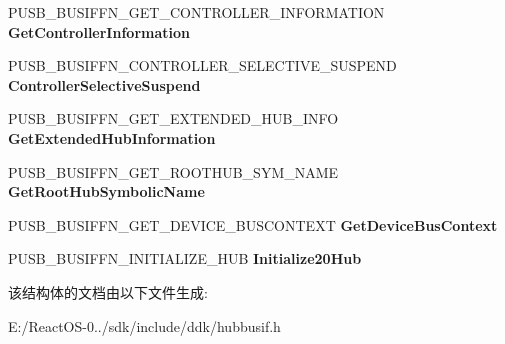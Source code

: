 \begin{DoxyCompactItemize}
P\+U\+S\+B\+\_\+\+B\+U\+S\+I\+F\+F\+N\+\_\+\+G\+E\+T\+\_\+\+C\+O\+N\+T\+R\+O\+L\+L\+E\+R\+\_\+\+I\+N\+F\+O\+R\+M\+A\+T\+I\+ON {\bfseries Get\+Controller\+Information}
\item 
\mbox{\label{struct___u_s_b___b_u_s___i_n_t_e_r_f_a_c_e___h_u_b___v2_a3ed00f1ed66dab9ca9abdd813ac71764}} 
P\+U\+S\+B\+\_\+\+B\+U\+S\+I\+F\+F\+N\+\_\+\+C\+O\+N\+T\+R\+O\+L\+L\+E\+R\+\_\+\+S\+E\+L\+E\+C\+T\+I\+V\+E\+\_\+\+S\+U\+S\+P\+E\+ND {\bfseries Controller\+Selective\+Suspend}
\item 
\mbox{\label{struct___u_s_b___b_u_s___i_n_t_e_r_f_a_c_e___h_u_b___v2_ae5a801a8e0b52594e8efd2cf4132cac6}} 
P\+U\+S\+B\+\_\+\+B\+U\+S\+I\+F\+F\+N\+\_\+\+G\+E\+T\+\_\+\+E\+X\+T\+E\+N\+D\+E\+D\+\_\+\+H\+U\+B\+\_\+\+I\+N\+FO {\bfseries Get\+Extended\+Hub\+Information}
\item 
\mbox{\label{struct___u_s_b___b_u_s___i_n_t_e_r_f_a_c_e___h_u_b___v2_a911d8c11e1701d4a6983f700e42526d6}} 
P\+U\+S\+B\+\_\+\+B\+U\+S\+I\+F\+F\+N\+\_\+\+G\+E\+T\+\_\+\+R\+O\+O\+T\+H\+U\+B\+\_\+\+S\+Y\+M\+\_\+\+N\+A\+ME {\bfseries Get\+Root\+Hub\+Symbolic\+Name}
\item 
\mbox{\label{struct___u_s_b___b_u_s___i_n_t_e_r_f_a_c_e___h_u_b___v2_aec0afead580c85d7479abdff52b4bf32}} 
P\+U\+S\+B\+\_\+\+B\+U\+S\+I\+F\+F\+N\+\_\+\+G\+E\+T\+\_\+\+D\+E\+V\+I\+C\+E\+\_\+\+B\+U\+S\+C\+O\+N\+T\+E\+XT {\bfseries Get\+Device\+Bus\+Context}
\item 
\mbox{\label{struct___u_s_b___b_u_s___i_n_t_e_r_f_a_c_e___h_u_b___v2_a6b71dcd15ff4413bd81cec572ff464d1}} 
P\+U\+S\+B\+\_\+\+B\+U\+S\+I\+F\+F\+N\+\_\+\+I\+N\+I\+T\+I\+A\+L\+I\+Z\+E\+\_\+H\+UB {\bfseries Initialize20\+Hub}
\end{DoxyCompactItemize}


该结构体的文档由以下文件生成\+:\begin{DoxyCompactItemize}
\item 
E\+:/\+React\+O\+S-\/0../sdk/include/ddk/hubbusif.\+h\end{DoxyCompactItemize}
